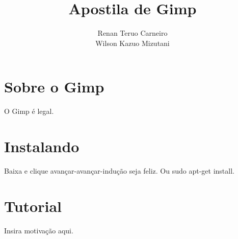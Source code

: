 \documentclass[12pt,onecolumn]{article}
\begin{document}
\title{Apostila de Gimp}
\author{Renan Teruo Carneiro \\ Wilson Kazuo Mizutani}
\maketitle

\section{Sobre o Gimp}
  O Gimp é legal.

\section{Instalando}
  Baixa e clique avançar-avançar-indução seja feliz.
  Ou sudo apt-get install.

\section{Tutorial}
  Insira motivação aqui.
\end{document}
